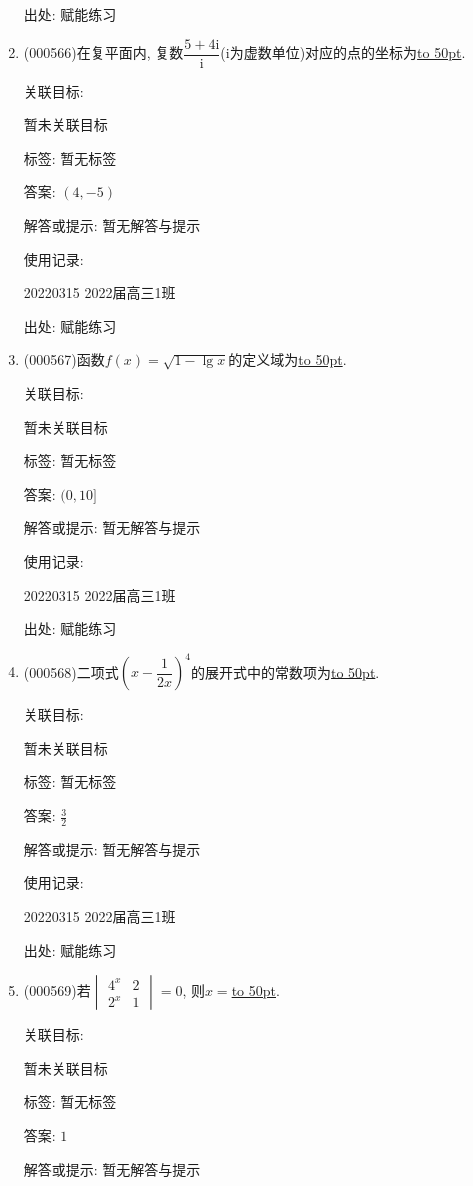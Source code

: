\documentclass[10pt,a4paper]{article}
\newcommand{\blank}[1]{\underline{\hbox to #1pt{}}}
\begin{document}
\begin{enumerate}[1.]
出处: 赋能练习
\item { (000566)}在复平面内, 复数$\dfrac{5+4\mathrm{i}}{\mathrm{i}}$($\mathrm{i}$为虚数单位)对应的点的坐标为\blank{50}.


关联目标:

暂未关联目标



标签: 暂无标签

答案: $(4,-5)$

解答或提示: 暂无解答与提示

使用记录:

20220315	2022届高三1班	


出处: 赋能练习
\item { (000567)}函数$f(x)=\sqrt{1-\lg x}$的定义域为\blank{50}.


关联目标:

暂未关联目标



标签: 暂无标签

答案: $(0,10 ]$

解答或提示: 暂无解答与提示

使用记录:

20220315	2022届高三1班	


出处: 赋能练习
\item { (000568)}二项式$(x-\dfrac1{2x})^4$的展开式中的常数项为\blank{50}.


关联目标:

暂未关联目标



标签: 暂无标签

答案: $\frac 32$

解答或提示: 暂无解答与提示

使用记录:

20220315	2022届高三1班	


出处: 赋能练习
\item { (000569)}若$\begin{vmatrix} 4^x & 2 \\ 2^x & 1 \end{vmatrix}=0$, 则$x=$\blank{50}.


关联目标:

暂未关联目标



标签: 暂无标签

答案: $1$

解答或提示: 暂无解答与提示


\end{enumerate}
\end{document}
